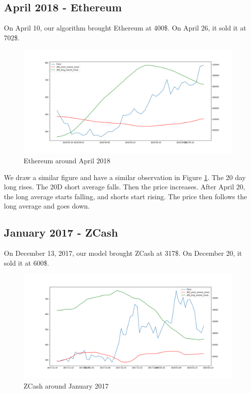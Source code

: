 \documentclass[letterpaper]{article}
\begin{document}
\subsection{April 2018 - Ethereum}
\label{sec:april_ethereum}
On April 10, our algorithm brought Ethereum at 400\$. On April 26, it sold it at 702\$.

\begin{figure}[h!]
    \includegraphics[width=\linewidth]{images/case2.png}
    \caption{Ethereum around April 2018}
    \label{fig:eth_april}
\end{figure}

We draw a similar figure and have a similar observation in Figure \ref{fig:eth_april}. The 20 day long rises. The 
20D short average falls. Then the price increases. After April 20, the long average starts falling, and shorts 
start rising. The price then follows the long average and goes down.

\subsection{January 2017 - ZCash}
\label{sec:jan_zcash}
On December 13, 2017, our model brought ZCash at 317\$. On December 20, it sold it at 600\$.

\begin{figure}[h!]
    \includegraphics[width=\linewidth]{images/case3.png}
    \caption{ZCash around January 2017}
    \label{fig:zec_jan}
\end{figure}
\end{document}
